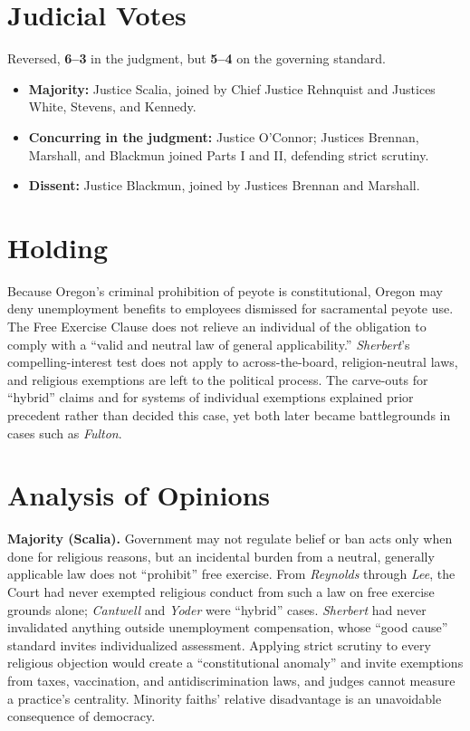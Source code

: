 \documentclass[12pt]{article}
\begin{document}
\section{Judicial Votes}

Reversed, \textbf{6--3} in the judgment, but \textbf{5--4} on the governing standard.
\begin{itemize}
\item \textbf{Majority:} Justice Scalia, joined by Chief Justice Rehnquist and Justices White, Stevens, and Kennedy.
\item \textbf{Concurring in the judgment:} Justice O'Connor; Justices Brennan, Marshall, and Blackmun joined Parts I and II, defending strict scrutiny.
\item \textbf{Dissent:} Justice Blackmun, joined by Justices Brennan and Marshall.
\end{itemize}

\section{Holding}

Because Oregon's criminal prohibition of peyote is constitutional, Oregon may deny unemployment benefits to employees dismissed for sacramental peyote use. The Free Exercise Clause does not relieve an individual of the obligation to comply with a ``valid and neutral law of general applicability.'' \textit{Sherbert}'s compelling-interest test does not apply to across-the-board, religion-neutral laws, and religious exemptions are left to the political process. The carve-outs for ``hybrid'' claims and for systems of individual exemptions explained prior precedent rather than decided this case, yet both later became battlegrounds in cases such as \textit{Fulton}.

\section{Analysis of Opinions}

\textbf{Majority (Scalia).} Government may not regulate belief or ban acts only when done for religious reasons, but an incidental burden from a neutral, generally applicable law does not ``prohibit'' free exercise. From \textit{Reynolds} through \textit{Lee}, the Court had never exempted religious conduct from such a law on free exercise grounds alone; \textit{Cantwell} and \textit{Yoder} were ``hybrid'' cases. \textit{Sherbert} had never invalidated anything outside unemployment compensation, whose ``good cause'' standard invites individualized assessment. Applying strict scrutiny to every religious objection would create a ``constitutional anomaly'' and invite exemptions from taxes, vaccination, and antidiscrimination laws, and judges cannot measure a practice's centrality. Minority faiths' relative disadvantage is an unavoidable consequence of democracy.
\end{document}
